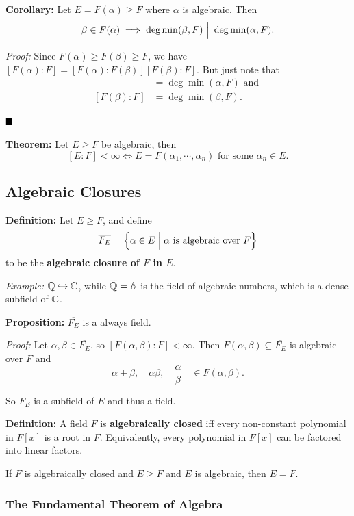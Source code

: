 \textbf{Corollary:} Let \(E = F(\alpha) \geq F\) where \(\alpha\) is
algebraic. Then
\[\beta \in F(\alpha) \implies \deg \min(\beta, F) {~\Bigm| ~} \deg \min(\alpha, F)
.\]

\emph{Proof:} Since \(F(\alpha) \geq F(\beta) \geq F\), we have
\([F(\alpha): F] = [F(\alpha): F(\beta)][F(\beta): F]\). But just note
that \begin{align*}
[F(\alpha): F]  &= \deg \min (\alpha, F) \text{ and } \\
[F(\beta): F]   &= \deg \min (\beta, F)
.\end{align*}

\(\qed\)

\textbf{Theorem:} Let \(E \geq F\) be algebraic, then \[
[E: F] < \infty \iff E = F(\alpha_1, \cdots, \alpha_n)
\text{ for some }
\alpha_n \in E
.\]

\hypertarget{algebraic-closures}{%
\subsection{Algebraic Closures}\label{algebraic-closures}}

\textbf{Definition:} Let \(E \geq F\), and define \[
\overline{F_E} = \left\{{\alpha \in E \mathrel{\Big|} \alpha \text{ is algebraic over } F}\right\}
\] to be the \textbf{algebraic closure of \(F\) in \(E\)}.

\emph{Example:} \({\mathbb{Q}} \hookrightarrow {\mathbb{C}}\), while \(\overline {{\mathbb{Q}}} = \Bbb{A}\)
is the field of algebraic numbers, which is a dense subfield of \({\mathbb{C}}\).

\textbf{Proposition:} \(\overline{F_E}\) is a always field.

\emph{Proof:} Let \(\alpha, \beta \in \overline{F_E}\), so
\([F(\alpha, \beta): F] < \infty\). Then
\(F(\alpha, \beta) \subseteq \overline{F_E}\) is algebraic over \(F\)
and \[
\alpha\pm \beta, \quad \alpha\beta,\quad \frac \alpha \beta \quad  \in F(\alpha, \beta)
.\]

So \(\overline{F_E}\) is a subfield of \(E\) and thus a field.

\textbf{Definition:} A field \(F\) is \textbf{algebraically closed} iff
every non-constant polynomial in \(F[x]\) is a root in \(F\).
Equivalently, every polynomial in \(F[x]\) can be factored into linear
factors.

If \(F\) is algebraically closed and \(E\geq F\) and \(E\) is algebraic,
then \(E=F\).

\hypertarget{the-fundamental-theorem-of-algebra}{%
\subsubsection{The Fundamental Theorem of
Algebra}\label{the-fundamental-theorem-of-algebra}}

